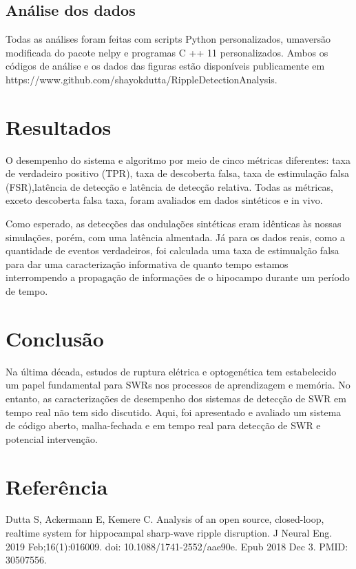 \documentclass{IEEEtran}
\begin{document}
\subsection{Análise dos dados}
Todas as análises foram feitas com scripts Python personalizados, umaversão modificada do pacote nelpy e programas C ++ 11 personalizados. Ambos os códigos de análise e os dados das figuras estão disponíveis publicamente em https://www.github.com/shayokdutta/RippleDetectionAnalysis.

\section{Resultados}
O desempenho do sistema e algoritmo por meio de cinco métricas diferentes: taxa de verdadeiro positivo (TPR), taxa de descoberta falsa, taxa de estimulação falsa (FSR),latência de detecção e latência de detecção relativa. Todas as métricas, exceto descoberta falsa taxa, foram avaliados em dados sintéticos e in vivo.

Como esperado, as detecções das ondulações sintéticas eram idênticas às nossas simulações, porém, com uma latência almentada. Já para os dados reais, como a quantidade de eventos verdadeiros, foi calculada uma taxa de estimualção falsa para dar uma caracterização informativa de quanto tempo estamos interrompendo a propagação de informações de
o hipocampo durante um período de tempo.


\section{Conclusão}
Na última década, estudos de ruptura elétrica e optogenética tem estabelecido um papel fundamental para SWRs nos processos de aprendizagem e memória. No entanto, as caracterizações de desempenho dos sistemas de detecção de SWR em tempo real não tem sido discutido. Aqui, foi apresentado e avaliado um sistema de código aberto, malha-fechada e em tempo real para detecção de SWR e potencial intervenção.

\section{Referência}
Dutta S, Ackermann E, Kemere C. Analysis of an open source, closed-loop, realtime system for hippocampal sharp-wave ripple disruption. J Neural Eng. 2019 Feb;16(1):016009. doi: 10.1088/1741-2552/aae90e. Epub 2018 Dec 3. PMID: 30507556.
\end{document}
